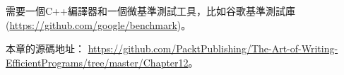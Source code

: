 需要一個C++編譯器和一個微基準測試工具，比如谷歌基準測試庫(\url{https://github.com/google/benchmark})。

本章的源碼地址： \url{https://github.com/PacktPublishing/The-Art-of-Writing-EfficientPrograms/tree/master/Chapter12}。